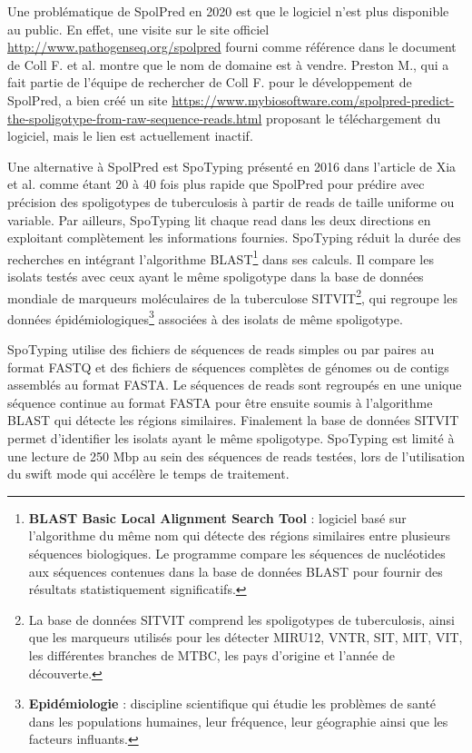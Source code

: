 \documentclass[twoside,a4paper,11pt,frenchb,openany]{report}
\begin{document}
Une problématique de SpolPred en 2020 est que le logiciel n'est plus disponible au public. En effet, une visite sur le site officiel \url{http://www.pathogenseq.org/spolpred} fourni comme référence dans le document \cite{coll} de Coll F. et al. montre que le nom de domaine est à vendre. Preston M., qui a fait partie de l'équipe de rechercher de Coll F. pour le développement de SpolPred, a bien créé un site \url{https://www.mybiosoftware.com/spolpred-predict-the-spoligotype-from-raw-sequence-reads.html} proposant le téléchargement du logiciel, mais le lien est actuellement inactif.

Une alternative à SpolPred est SpoTyping présenté en 2016 dans l'article \cite{xia} de Xia et al. comme étant 20 à 40 fois plus rapide que SpolPred pour prédire avec précision des spoligotypes de tuberculosis à partir de reads de taille uniforme ou variable. Par ailleurs, SpoTyping lit chaque read dans les deux directions en exploitant complètement les informations fournies. SpoTyping réduit la durée des recherches en intégrant l'algorithme BLAST\footnote{\textbf{BLAST Basic Local Alignment Search Tool} : logiciel basé sur l'algorithme du même nom qui détecte des régions similaires entre plusieurs séquences biologiques. Le programme compare les séquences de nucléotides aux séquences contenues dans la base de données BLAST pour fournir des résultats statistiquement significatifs.} dans ses calculs. Il compare les isolats testés avec ceux ayant le même spoligotype dans la base de données mondiale de marqueurs moléculaires de la tuberculose SITVIT\footnote{La base de données SITVIT comprend les spoligotypes de tuberculosis, ainsi que les marqueurs utilisés pour les détecter MIRU12, VNTR, SIT, MIT, VIT, les différentes branches de MTBC, les pays d'origine et l'année de découverte.}, qui regroupe les données épidémiologiques\footnote{\textbf{Epidémiologie} : discipline scientifique qui étudie les problèmes de santé dans les populations humaines, leur fréquence, leur géographie ainsi que les facteurs influants.} associées à des isolats de même spoligotype.

SpoTyping utilise des fichiers de séquences de reads simples ou par paires au format FASTQ et des fichiers de séquences complètes de génomes ou de contigs assemblés au format FASTA. Le séquences de reads sont regroupés en une unique séquence continue au format FASTA pour être ensuite soumis à l'algorithme BLAST qui détecte les régions similaires. Finalement la base de données SITVIT permet d'identifier les isolats ayant le même spoligotype. SpoTyping est limité à une lecture de 250 Mbp au sein des séquences de reads testées, lors de l'utilisation du swift mode qui accélère le temps de traitement.
\end{document}
